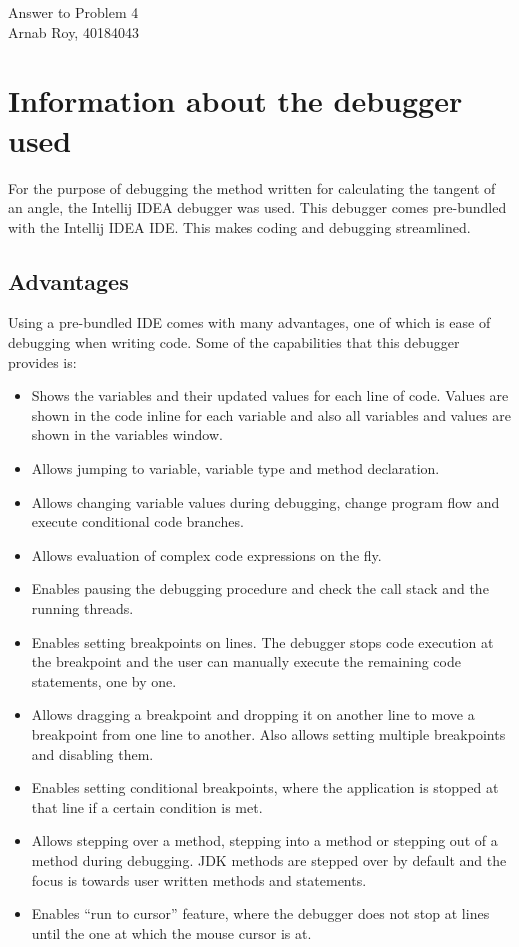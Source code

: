 \documentclass[12pt]{article}
\begin{document}
\begin{center}
    \huge{Answer to Problem 4} \\
\large{Arnab Roy, 40184043 }
\end{center}

\section{Information about the debugger used}
For the purpose of debugging the method written for calculating the tangent of an angle, the Intellij IDEA debugger was used. This debugger comes pre-bundled with the Intellij IDEA IDE. This makes coding and debugging streamlined.
\subsection{Advantages}
Using a pre-bundled IDE comes with many advantages, one of which is ease of debugging when writing code. Some of the capabilities that this debugger provides is:
\begin{itemize}
    \item Shows the variables and their updated values for each line of code. Values are shown in the code inline for each variable and also all variables and values are shown in the variables window.
    \item Allows jumping to variable, variable type and method declaration.
    \item Allows changing variable values during debugging, change program flow and execute conditional code branches.
    \item Allows evaluation of complex code expressions on the fly.
    \item Enables pausing the debugging procedure and check the call stack and the running threads.
    \item Enables setting breakpoints on lines. The debugger stops code execution at the breakpoint and the user can manually execute the remaining code statements, one by one.
    \item Allows dragging a breakpoint and dropping it on another line to move a breakpoint from one line to another. Also allows setting multiple breakpoints and disabling them.
    \item Enables setting conditional breakpoints, where the application is stopped at that line if a certain condition is met.
    \item Allows stepping over a method, stepping into a method or stepping out of a method during debugging. JDK methods are stepped over by default and the focus is towards user written methods and statements.
    \item Enables “run to cursor” feature, where the debugger does not stop at lines until the one at which the mouse cursor is at.
\end{itemize}
\end{document}
